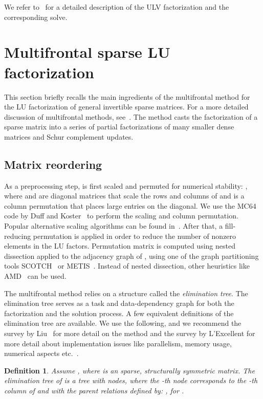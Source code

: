 \documentclass{article}
\newtheorem{mydef}{Definition}
\begin{document}
We refer to~\cite{FHR} for a detailed description of the ULV
factorization and the corresponding solve.














\section{Multifrontal sparse LU factorization}\label{sec:MF}
This section briefly recalls the main ingredients of the multifrontal
method for the LU factorization of general invertible sparse
matrices. For a more detailed discussion of multifrontal methods,
see~\cite{duff1983multifrontal,liu1992multifrontal}.  The method casts
the factorization of a sparse matrix into a series of partial
factorizations of many smaller dense matrices and Schur complement
updates.


\subsection{Matrix reordering}
As a preprocessing step,  is first scaled and permuted for
numerical stability: , where  and 
are diagonal matrices that scale the rows and columns of  and 
is a column permutation that places large entries on the diagonal. We
use the MC64 code by Duff and Koster~\cite{duff1999design} to perform
the scaling and column permutation. Popular alternative scaling
algorithms can be found
in~\cite{ruiz2001scaling,amestoy2008parallel,curtis1972automatic}.
After that, a fill-reducing permutation  is applied
in order to reduce the number of nonzero elements in the LU
factors. Permutation matrix  is computed using nested dissection
applied to the adjacency graph of , using one of the graph
partitioning tools SCOTCH~\cite{pellegrini1996scotch} or
METIS~\cite{karypis1998fast}. Instead of nested dissection, other
heuristics like AMD~\cite{amestoy1996amd} can be used.

The multifrontal method relies on a structure called the
\emph{elimination tree}. The elimination tree serves as a task and
data-dependency graph for both the factorization and the solution
process. A few equivalent definitions of the elimination tree are
available. We use the following, and we recommend the survey by
Liu~\cite{liu1992multifrontal} for more detail on the method and the
survey by L'Excellent for more detail about implementation issues like
parallelism, memory usage, numerical aspects
etc.~\cite{lexcellent2012multifrontal}.
\begin{mydef}
  Assume , where  is an  sparse, structurally
  symmetric matrix. The elimination tree of  is a tree with 
  nodes, where the -th node corresponds to the -th column of 
  and with the parent relations defined by: , for .
\end{mydef}
\end{document}
